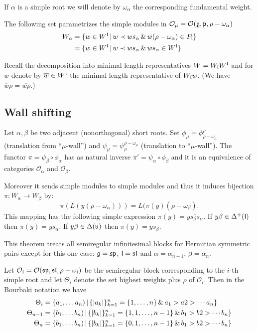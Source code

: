 \documentclass[a4paper,10pt]{article}
\begin{document}
If $\alpha$ is a simple root we will denote by $\omega_\alpha$ the corresponding fundamental weight. 

The following set parametrizes the simple modules in $\mathcal{O}_\mu = \mathcal{O}(\mathfrak{g}, \mathfrak{p}, \rho - 
\omega_\alpha)$
\begin{align*}
W_\alpha &= \{ w \in W^{\mathfrak{l}} \,|\, w \prec w s_\alpha \,\&\, w(\rho-\omega_\alpha) \in P_{\mathfrak{l}} \} \\
         &= \{ w \in W^{\mathfrak{l}} \,|\, w \prec w s_\alpha \,\&\, ws_\alpha \in W^{\mathfrak{l}} \} 
\end{align*}

Recall the decomposition into minimal length representatives $W = W_{\mathfrak{l}}W^{\mathfrak{l}}$ and for $w$ denote by $\overline{w} \in W^{\mathfrak{l}}$ the minimal length representative of $W_{\mathfrak{l}} w.$ (We have $\overline{w}\rho = \overline{w\rho}.$) 


\subsection{Wall shifting}

\begin{theorem}
	Let $\alpha, \beta$ be two adjacent (nonorthogonal) short roots. Set $\phi_\mu = \phi_{\rho-\omega_\mu}^\rho$ (translation from ``$\mu$-wall'') and $\psi_\mu = \psi_\rho^{\rho-\omega_\mu}$ (translation to ``$\mu$-wall''). The functor $\pi = \psi_\beta \circ \phi_\alpha$ has as natural inverse $\pi' = \psi_\alpha \circ \phi_\beta$ and it is an equivalence of categories $\mathcal{O}_\alpha$ and $\mathcal{O}_\beta.$
	
	Moreover it sends simple modules to simple modules and thus it induces bijection $\pi\colon W_\alpha \to W_\beta$ by:
	\[
		\pi(L(y(\rho - \omega_\alpha))) = L(\pi(y) (\rho - \omega_\beta).
	\]
	This mapping has the following simple expression $\pi(y) = \overline{ys_\beta s_\alpha}.$
	If $y\beta \in \Delta^+(\mathfrak{l})$ then $\pi(y) = ys_\alpha$. If $y\beta \in \Delta(\mathfrak{u})$ then $\pi(y) = ys_\beta.$
\end{theorem}

This theorem treats all semiregular infinitesimal blocks for Hermitian symmetric pairs except for this one case: $\mathfrak{g} = \mathfrak{sp}$, $\mathfrak{l} = \mathfrak{sl}$ and $\alpha = \alpha_{n-1}$, $\beta = \alpha_n.$ 

Let $\mathcal{O}_i = \mathcal{O}(\mathfrak{sp}, \mathfrak{sl}, \rho - \omega_i)$ be the semiregular block corresponding to the $i$-th simple root and let $\Theta_i$ denote the set highest weights plus $\rho$ of $\mathcal{O}_i$. Then in the Bourbaki notation we have
\begin{align*}
	\Theta_i &= \{a_1, \ldots a_n) \,|\, \{|a_k|\}_{k=1}^n = \{1, \ldots, n\} \,\&\, a_1 > a2 > \cdots a_n \} \\
	\Theta_{n-1} &= \{b_1, \ldots b_n) \,|\, \{|b_k|\}_{k=1}^n = \{1, 1, \ldots, n-1\} \,\&\, b_1 > b2 > \cdots b_n \} \\
	\Theta_{n} &= \{b_1, \ldots b_n) \,|\, \{|b_k|\}_{k=1}^n = \{0, 1, \ldots, n-1\} \,\&\, b_1 > b2 > \cdots b_n \} 
\end{align*}
\end{document}
